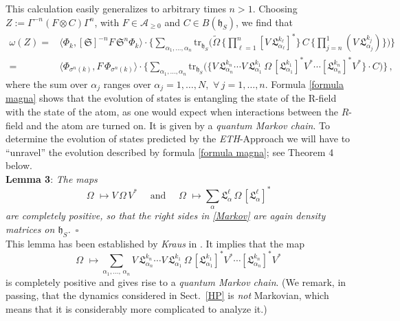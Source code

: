 \documentclass[12pt]{article}
\begin{document}
This calculation easily generalizes to arbitrary times $n>1$. Choosing 
 $Z:= \Gamma^{-n} (F\otimes C) \Gamma^{n}$, with $F\in \mathcal{A}_{\geq 0}$ and $C\in B(\mathfrak{h}_{S})$, 
  we find that
 \begin{align}\label{formula magna}
 \omega(Z)=& \langle \Phi_{{k}}, [\mathfrak{S}]^{-n} F\, \mathfrak{S}^{n} \Phi_{{k}}\rangle \cdot
\Big\{ \sum_{\alpha_1, \dots, \alpha_n} \text{tr}_{\mathfrak{h}_S} \Big(\widetilde{\Omega}\, \Big\{\prod_{\ell = 1}^{n} [V\,\mathfrak{L}_{\alpha_{\ell}}^{k_{\ell}}]^{*}\Big\}\, C\, \Big\{ \prod_{j=n}^{1} (V\, \mathfrak{L}_{\alpha_j}^{k_j})\Big\} \Big) \Big\}\nonumber \\
 =& \langle \Phi_{\sigma^{n}({k})}, F \,\Phi_{\sigma^{n}({k})} \rangle\cdot \Big\{\sum_{\alpha_1, \dots, \alpha_n} 
 \text{tr}_{\mathfrak{h}_S} \Big(\Big\{V\,\mathfrak{L}_{\alpha_n}^{k_n} \cdots V\,\mathfrak{L}_{\alpha_1}^{k_1} \,\Omega\, 
 [\mathfrak{L}_{\alpha_1}^{k_1}]^{*}V^{*}\cdots [\mathfrak{L}_{\alpha_n}^{k_n}]^{*}V^{*}\Big\}\cdot C\Big) \Big\}\,,
 \end{align}
where the sum over $\alpha_j$ ranges over $\alpha_j =1,\dots, N,\,\, \forall\, j=1,\dots, n$. Formula \eqref{formula magna} 
shows that the evolution of states is entangling the state of the R-field with the state of the atom, as one 
would expect when interactions between the $R$-field and the atom are turned on. It is given by a 
\textit{quantum Markov chain}. To determine the evolution of states predicted by the \textit{ETH}-Approach we 
will have to ``unravel'' the evolution described by formula \eqref{formula magna}; see Theorem 4 below.\\

{\bf{Lemma 3}}: \textit{The maps
\begin{equation}\label{Markov}
\Omega\,\, \mapsto V\,\Omega\,V^{*}\quad \text{ and }\quad
\Omega\,\, \mapsto \sum_{\alpha} \mathfrak{L}_{\alpha}^{\ell}\,\Omega\, [\mathfrak{L}_{\alpha}^{\ell}]^{*}
\end{equation}
are \textit{completely positive}, so that the right sides in \eqref{Markov} are again density matrices on $\mathfrak{h}_S$.}
\,$\square$\\

This lemma has been established by \textit{Kraus} in \cite{Kraus}. It implies that the map 
$$\Omega\,\,\mapsto \sum_{\alpha_1, \dots, \, \alpha_n} V\,\mathfrak{L}_{\alpha_n}^{k_n} \cdots V\,\mathfrak{L}_{\alpha_1}^{k_1} \,\Omega\, 
 [\mathfrak{L}_{\alpha_1}^{k_1}]^{*}V^{*}\cdots [\mathfrak{L}_{\alpha_n}^{k_n}]^{*}V^{*}$$
is completely positive and gives rise to a \textit{quantum Markov chain}. (We remark, in passing, that the dynamics considered in Sect.~\ref{HP} is \textit{not} Markovian, which means that it is considerably more complicated to analyze it.)\\
\end{document}
